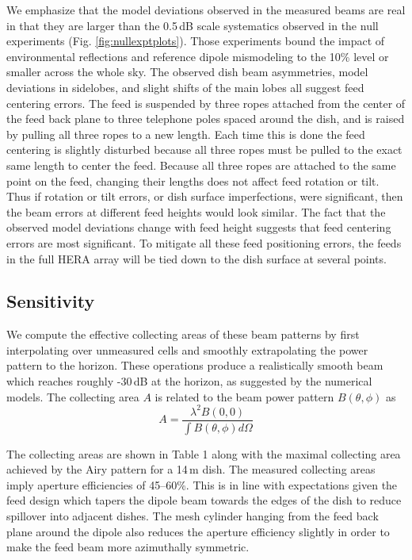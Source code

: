 We emphasize that the model deviations observed in the measured beams are real in that they are larger than the 0.5\,dB scale systematics observed in the null experiments (Fig. \ref{fig:nullexptplots}). Those experiments bound the impact of environmental reflections and reference dipole mismodeling to the 10\% level or smaller across the whole sky. The observed dish beam asymmetries, model deviations in sidelobes, and slight shifts of the main lobes all suggest feed centering errors. The feed is suspended by three ropes attached from the center of the feed back plane to three telephone poles spaced around the dish, and is raised by pulling all three ropes to a new length. Each time this is done the feed centering is slightly disturbed because all three ropes must be pulled to the exact same length to center the feed. Because all three ropes are attached to the same point on the feed, changing their lengths does not affect feed rotation or tilt. Thus if rotation or tilt errors, or dish surface imperfections, were significant, then the beam errors at different feed heights would look similar. The fact that the observed model deviations change with feed height suggests that feed centering errors are most significant. To mitigate all these feed positioning errors, the feeds in the full HERA array will be tied down to the dish surface at several points.

\subsection{Sensitivity}

We compute the effective collecting areas of these beam patterns by first interpolating over unmeasured cells and smoothly extrapolating the power pattern to the horizon. These operations produce a realistically smooth beam which reaches roughly -30\,dB at the horizon, as suggested by the numerical models. The collecting area $A$ is related to the beam power pattern $B(\theta,\phi)$ as
\begin{equation}
	A=\frac{\lambda^2 B(0,0)}{\int B(\theta,\phi)d\Omega}
\end{equation}

The collecting areas are shown in Table 1 along with the maximal collecting area achieved by the Airy pattern for a 14\,m dish. The measured collecting areas imply aperture efficiencies of 45--60\%. This is in line with expectations given the feed design which tapers the dipole beam towards the edges of the dish to reduce spillover into adjacent dishes. The mesh cylinder hanging from the feed back plane around the dipole also reduces the aperture efficiency slightly in order to make the feed beam more azimuthally symmetric. 

